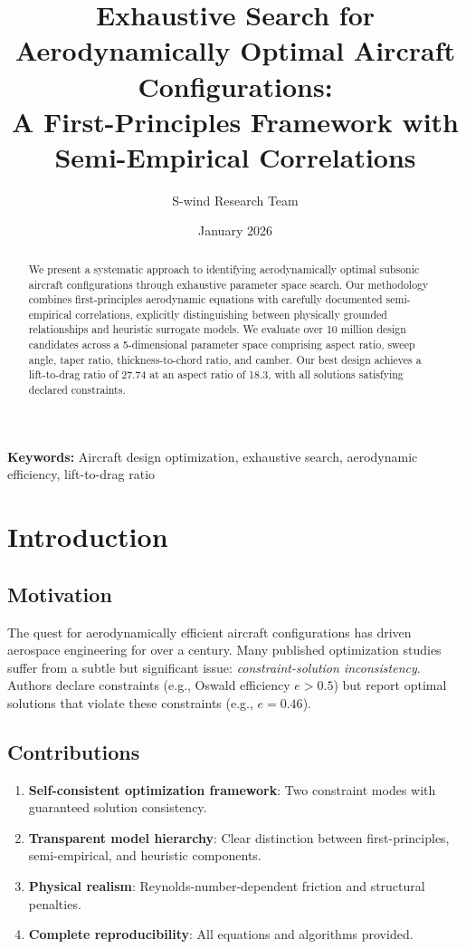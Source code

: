 \documentclass[11pt,a4paper]{article}
\title{Exhaustive Search for Aerodynamically Optimal Aircraft Configurations:\\
A First-Principles Framework with Semi-Empirical Correlations}
\author{S-wind Research Team}
\date{January 2026}
\begin{document}
\maketitle

\begin{abstract}
We present a systematic approach to identifying aerodynamically optimal subsonic aircraft configurations through exhaustive parameter space search. Our methodology combines first-principles aerodynamic equations with carefully documented semi-empirical correlations, explicitly distinguishing between physically grounded relationships and heuristic surrogate models. We evaluate over 10 million design candidates across a 5-dimensional parameter space comprising aspect ratio, sweep angle, taper ratio, thickness-to-chord ratio, and camber. Our best design achieves a lift-to-drag ratio of 27.74 at an aspect ratio of 18.3, with all solutions satisfying declared constraints.
\end{abstract}

\textbf{Keywords:} Aircraft design optimization, exhaustive search, aerodynamic efficiency, lift-to-drag ratio

\section{Introduction}

\subsection{Motivation}

The quest for aerodynamically efficient aircraft configurations has driven aerospace engineering for over a century. Many published optimization studies suffer from a subtle but significant issue: \textit{constraint-solution inconsistency}. Authors declare constraints (e.g., Oswald efficiency $e > 0.5$) but report optimal solutions that violate these constraints (e.g., $e = 0.46$).

\subsection{Contributions}

\begin{enumerate}
    \item \textbf{Self-consistent optimization framework}: Two constraint modes with guaranteed solution consistency.
    \item \textbf{Transparent model hierarchy}: Clear distinction between first-principles, semi-empirical, and heuristic components.
    \item \textbf{Physical realism}: Reynolds-number-dependent friction and structural penalties.
    \item \textbf{Complete reproducibility}: All equations and algorithms provided.
\end{enumerate}
\end{document}
